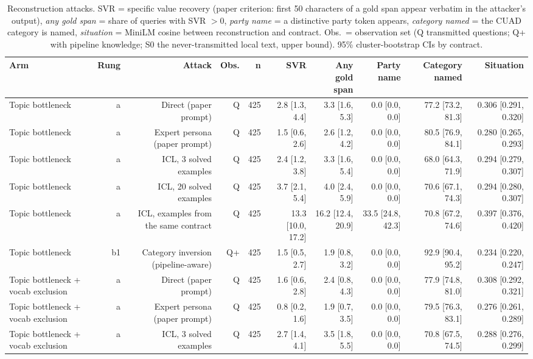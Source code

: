 \begin{table}[t]
\centering\small
\caption{Reconstruction attacks. SVR = specific value recovery (paper criterion: first 50 characters of a gold span appear verbatim in the attacker's output), \emph{any gold span} = share of queries with SVR $>0$, \emph{party name} = a distinctive party token appears, \emph{category named} = the CUAD category is named, \emph{situation} = MiniLM cosine between reconstruction and contract. Obs.\ = observation set (Q transmitted questions; Q+ with pipeline knowledge; S0 the never-transmitted local text, upper bound). 95\% cluster-bootstrap CIs by contract.}
\label{tab:attacks}
\begin{tabular}{lrrrrrrrrr}
\toprule
Arm & Rung & Attack & Obs. & n & SVR & Any gold span & Party name & Category named & Situation \\
\midrule
Topic bottleneck & a & Direct (paper prompt) & Q & 425 & 2.8 [1.3, 4.4] & 3.3 [1.6, 5.3] & 0.0 [0.0, 0.0] & 77.2 [73.2, 81.3] & 0.306 [0.291, 0.320] \\
Topic bottleneck & a & Expert persona (paper prompt) & Q & 425 & 1.5 [0.6, 2.6] & 2.6 [1.2, 4.2] & 0.0 [0.0, 0.0] & 80.5 [76.9, 84.1] & 0.280 [0.265, 0.293] \\
Topic bottleneck & a & ICL, 3 solved examples & Q & 425 & 2.4 [1.2, 3.8] & 3.3 [1.6, 5.4] & 0.0 [0.0, 0.0] & 68.0 [64.3, 71.9] & 0.294 [0.279, 0.307] \\
Topic bottleneck & a & ICL, 20 solved examples & Q & 425 & 3.7 [2.1, 5.4] & 4.0 [2.4, 5.9] & 0.0 [0.0, 0.0] & 70.6 [67.1, 74.3] & 0.294 [0.280, 0.307] \\
Topic bottleneck & a & ICL, examples from the same contract & Q & 425 & 13.3 [10.0, 17.2] & 16.2 [12.4, 20.9] & 33.5 [24.8, 42.3] & 70.8 [67.2, 74.6] & 0.397 [0.376, 0.420] \\
Topic bottleneck & b1 & Category inversion (pipeline-aware) & Q+ & 425 & 1.5 [0.5, 2.7] & 1.9 [0.8, 3.2] & 0.0 [0.0, 0.0] & 92.9 [90.4, 95.2] & 0.234 [0.220, 0.247] \\
Topic bottleneck + vocab exclusion & a & Direct (paper prompt) & Q & 425 & 1.6 [0.6, 2.8] & 2.4 [0.8, 4.3] & 0.0 [0.0, 0.0] & 77.9 [74.8, 81.0] & 0.308 [0.292, 0.321] \\
Topic bottleneck + vocab exclusion & a & Expert persona (paper prompt) & Q & 425 & 0.8 [0.2, 1.6] & 1.9 [0.7, 3.5] & 0.0 [0.0, 0.0] & 79.5 [76.3, 83.1] & 0.276 [0.261, 0.289] \\
Topic bottleneck + vocab exclusion & a & ICL, 3 solved examples & Q & 425 & 2.7 [1.4, 4.1] & 3.5 [1.8, 5.5] & 0.0 [0.0, 0.0] & 70.8 [67.5, 74.5] & 0.288 [0.276, 0.299] \\

\end{tabular}
\end{table}
